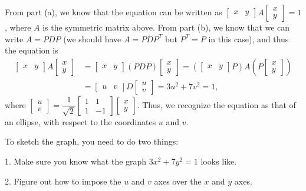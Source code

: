 \documentclass[letterpaper,12pt]{article}
\begin{document}
\begin{enumerate}
\begin{enumerate}
From part (a), we know that the equation can be written as $\begin{bmatrix}x&y\end{bmatrix}A\begin{bmatrix}x\\y\end{bmatrix}=1$, where $A$ is the symmetric matrix above. From part (b), we know that we can write $A=PDP$ (we should have $A=PDP^T$ but $P^T=P$ in this case), and thus the equation is
\begin{align*}
 \begin{bmatrix}x&y\end{bmatrix}A\begin{bmatrix}x\\y\end{bmatrix}&=\begin{bmatrix}x&y\end{bmatrix}(PDP)\begin{bmatrix}x\\y\end{bmatrix}=(\begin{bmatrix}x&y\end{bmatrix}P)A(P\begin{bmatrix}x\\y\end{bmatrix})\\
& = \begin{bmatrix}u&v\end{bmatrix}D\begin{bmatrix}u\\v\end{bmatrix} = 3u^2+7v^2=1,
\end{align*}
where $\begin{bmatrix}u\\v\end{bmatrix} = \dfrac{1}{\sqrt{2}}\begin{bmatrix}1&1\\1&-1\end{bmatrix}\begin{bmatrix}x\\y\end{bmatrix}$. Thus, we recognize the equation as that of an ellipse, with respect to the coordinates $u$ and $v$. 

To sketch the graph, you need to do two things:

1. Make sure you know what the graph $3x^2+7y^2=1$ looks like.

2. Figure out how to impose the $u$ and $v$ axes over the $x$ and $y$ axes.


\end{enumerate}
\end{enumerate}
\end{document}
